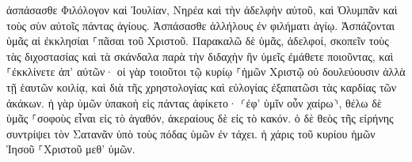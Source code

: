 \documentclass{openreader}
\begin{document}
ἀσπάσασθε Φιλόλογον καὶ Ἰουλίαν, Νηρέα καὶ τὴν ἀδελφὴν αὐτοῦ, καὶ Ὀλυμπᾶν καὶ τοὺς σὺν αὐτοῖς πάντας ἁγίους. 
Ἀσπάσασθε ἀλλήλους ἐν φιλήματι ἁγίῳ. Ἀσπάζονται ὑμᾶς αἱ ἐκκλησίαι ⸀πᾶσαι τοῦ Χριστοῦ. 
Παρακαλῶ δὲ ὑμᾶς, ἀδελφοί, σκοπεῖν τοὺς τὰς διχοστασίας καὶ τὰ σκάνδαλα παρὰ τὴν διδαχὴν ἣν ὑμεῖς ἐμάθετε ποιοῦντας, καὶ ⸀ἐκκλίνετε ἀπ’ αὐτῶν· 
οἱ γὰρ τοιοῦτοι τῷ κυρίῳ ⸀ἡμῶν Χριστῷ οὐ δουλεύουσιν ἀλλὰ τῇ ἑαυτῶν κοιλίᾳ, καὶ διὰ τῆς χρηστολογίας καὶ εὐλογίας ἐξαπατῶσι τὰς καρδίας τῶν ἀκάκων. 
ἡ γὰρ ὑμῶν ὑπακοὴ εἰς πάντας ἀφίκετο· ⸂ἐφ’ ὑμῖν οὖν χαίρω⸃, θέλω δὲ ὑμᾶς ⸀σοφοὺς εἶναι εἰς τὸ ἀγαθόν, ἀκεραίους δὲ εἰς τὸ κακόν. 
ὁ δὲ θεὸς τῆς εἰρήνης συντρίψει τὸν Σατανᾶν ὑπὸ τοὺς πόδας ὑμῶν ἐν τάχει. ἡ χάρις τοῦ κυρίου ἡμῶν Ἰησοῦ ⸀Χριστοῦ μεθ’ ὑμῶν. 
\end{document}

